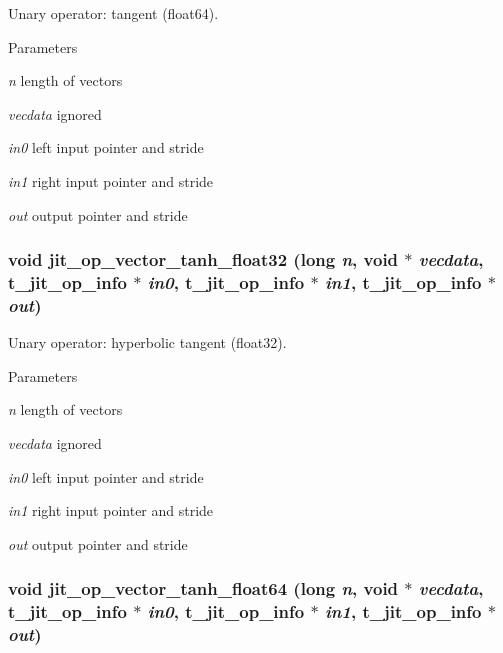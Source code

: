 Unary operator: tangent (float64). 
\begin{DoxyParams}{Parameters}
\item[{\em n}]length of vectors \item[{\em vecdata}]ignored \item[{\em in0}]left input pointer and stride \item[{\em in1}]right input pointer and stride \item[{\em out}]output pointer and stride \end{DoxyParams}
\hypertarget{group__opvecmod_ga563f5161f3b5f3262cdde07883cfcfd5}{
\subsubsection[{jit\_\-op\_\-vector\_\-tanh\_\-float32}]{\setlength{\rightskip}{0pt plus 5cm}void jit\_\-op\_\-vector\_\-tanh\_\-float32 (long {\em n}, \/  void $\ast$ {\em vecdata}, \/  {\bf t\_\-jit\_\-op\_\-info} $\ast$ {\em in0}, \/  {\bf t\_\-jit\_\-op\_\-info} $\ast$ {\em in1}, \/  {\bf t\_\-jit\_\-op\_\-info} $\ast$ {\em out})}}
\label{group__opvecmod_ga563f5161f3b5f3262cdde07883cfcfd5}


Unary operator: hyperbolic tangent (float32). 
\begin{DoxyParams}{Parameters}
\item[{\em n}]length of vectors \item[{\em vecdata}]ignored \item[{\em in0}]left input pointer and stride \item[{\em in1}]right input pointer and stride \item[{\em out}]output pointer and stride \end{DoxyParams}
\hypertarget{group__opvecmod_ga0c9a6939ee7f08cd26758a368ad36d85}{
\subsubsection[{jit\_\-op\_\-vector\_\-tanh\_\-float64}]{\setlength{\rightskip}{0pt plus 5cm}void jit\_\-op\_\-vector\_\-tanh\_\-float64 (long {\em n}, \/  void $\ast$ {\em vecdata}, \/  {\bf t\_\-jit\_\-op\_\-info} $\ast$ {\em in0}, \/  {\bf t\_\-jit\_\-op\_\-info} $\ast$ {\em in1}, \/  {\bf t\_\-jit\_\-op\_\-info} $\ast$ {\em out})}}
\label{group__opvecmod_ga0c9a6939ee7f08cd26758a368ad36d85}


